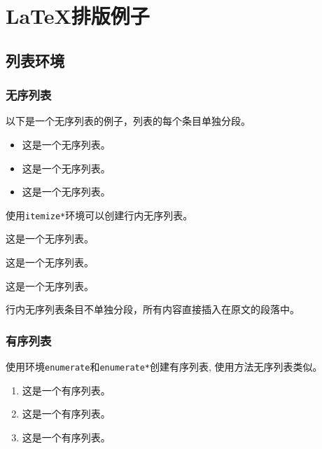 
\chapter{ \LaTeX 排版例子}
\label{chap:example}

\section{列表环境}
\label{sec:list}

\subsection{无序列表}
\label{sec:unorderlist}

以下是一个无序列表的例子，列表的每个条目单独分段。

\begin{itemize}
  \item 这是一个无序列表。
  \item 这是一个无序列表。
  \item 这是一个无序列表。
\end{itemize}

使用\verb+itemize*+环境可以创建行内无序列表。
\begin{itemize*}
  \item 这是一个无序列表。
  \item 这是一个无序列表。
  \item 这是一个无序列表。
\end{itemize*}
行内无序列表条目不单独分段，所有内容直接插入在原文的段落中。

\subsection{有序列表}
\label{sec:orderlist}

使用环境\verb+enumerate+和\verb+enumerate*+创建有序列表,
使用方法无序列表类似。

\begin{enumerate}
  \item 这是一个有序列表。
  \item 这是一个有序列表。
  \item 这是一个有序列表。
\end{enumerate}

